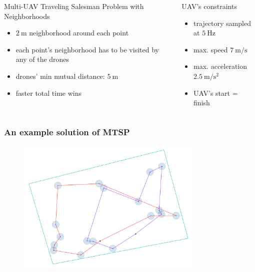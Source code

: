 \documentclass[aspectratio=1610]{beamer}
\newcommand{\unit}[2]{$#1~\ensuremath{\mathrm{#2}}$}
\begin{document}
\begin{frame}
\begin{columns}[c]
    \begin{block}{Multi-UAV Traveling Salesman Problem with Neighborhoods}
      \begin{itemize}
        \item \unit{2}{m} neighborhood around each point
        \item each point's neighborhood has to be visited by any of the drones
        \item drones' min mutual distance: \unit{5}{m}
        \item faster total time wins
      \end{itemize}
    \end{block}

    \begin{block}{UAV's constraints}
      \begin{itemize}
        \item trajectory sampled at \unit{5}{Hz}
        \item max. speed \unit{7}{m/s}
        \item max. acceleration \unit{2.5}{m/s^2}
        \item UAV's start = finish
      \end{itemize}
    \end{block}

  \end{columns}

\end{frame}


\begin{frame}
  \frametitle{An example solution of MTSP}

  \begin{figure}
    \includegraphics[width=0.8\textwidth]{./fig/tsp_segments_center.png}
  \end{figure}

\end{frame}
\end{document}

